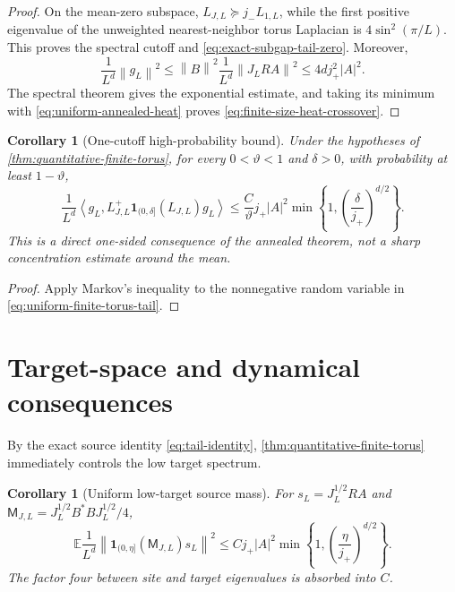 \documentclass[11pt]{article}
\newtheorem{corollary}[theorem]{Corollary}
\theoremstyle{definition}
\theoremstyle{remark}
\newcommand{\E}{\mathbb E}
\newcommand{\ip}[2]{\left\langle #1,#2\right\rangle}
\newcommand{\norm}[1]{\left\lVert #1\right\rVert}
\newcommand{\abs}[1]{\left\lvert #1\right\rvert}
\begin{document}
\begin{proof}
On the mean-zero subspace,
$L_{J,L}\succeq j_-L_{1,L}$, while the first positive eigenvalue of the
unweighted nearest-neighbor torus Laplacian is
$4\sin^2(\pi/L)$.  This proves the spectral cutoff and
\eqref{eq:exact-subgap-tail-zero}.  Moreover,
\[
 \frac1{L^d}\norm{g_L}^2
 \le \norm{B}^2\frac1{L^d}\norm{J_LRA}^2
 \le4dj_+^2\abs{A}^2.
\]
The spectral theorem gives the exponential estimate, and taking its minimum
with \eqref{eq:uniform-annealed-heat} proves
\eqref{eq:finite-size-heat-crossover}.
\end{proof}

\begin{corollary}[One-cutoff high-probability bound]
\label{cor:high-probability-tail}
Under the hypotheses of \cref{thm:quantitative-finite-torus}, for every
$0<\vartheta<1$ and $\delta>0$, with probability at least $1-\vartheta$,
\begin{equation}
 \frac1{L^d}\ip{g_L}{L_{J,L}^+
 \bm{1}_{(0,\delta]}(L_{J,L})g_L}
 \le \frac{C}{\vartheta}j_+\abs{A}^2
 \min\left\{1,\left(\frac\delta{j_+}\right)^{d/2}\right\}.
 \label{eq:high-probability-tail}
\end{equation}
This is a direct one-sided consequence of the annealed theorem, not a sharp
concentration estimate around the mean.
\end{corollary}

\begin{proof}
Apply Markov's inequality to the nonnegative random variable in
\eqref{eq:uniform-finite-torus-tail}.
\end{proof}

\section{Target-space and dynamical consequences}

By the exact source identity \eqref{eq:tail-identity}, \cref{thm:quantitative-finite-torus} immediately controls the low target spectrum.

\begin{corollary}[Uniform low-target source mass]
\label{cor:uniform-target-tail}
For $s_L=J_L^{1/2}RA$ and
$\mathsf M_{J,L}=J_L^{1/2}B^*BJ_L^{1/2}/4$,
\begin{equation}
 \E\frac1{L^d}
 \norm{\bm{1}_{(0,\eta]}(\mathsf M_{J,L})s_L}^2
 \le Cj_+\abs{A}^2
 \min\left\{1,\left(\frac\eta{j_+}\right)^{d/2}\right\}.
 \label{eq:uniform-target-tail}
\end{equation}
The factor four between site and target eigenvalues is absorbed into $C$.
\end{corollary}
\end{document}
